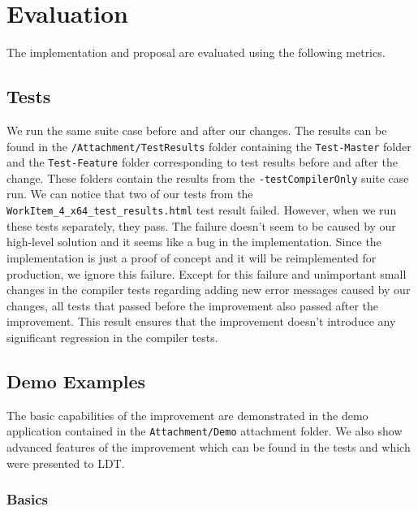 \chapter{Evaluation}

The implementation and proposal are evaluated using the following metrics.

\section{Tests}

We run the same suite case before and after our changes. 
The results can be found in the \texttt{/Attachment/TestResults} folder containing the \texttt{Test-Master} folder and the \texttt{Test-Feature} folder corresponding to test results before and after the change. 
These folders contain the results from the \texttt{-testCompilerOnly} suite case run.
We can notice that two of our tests from the \texttt{WorkItem\_4\_x64\_test\_results.html} test result failed.
However, when we run these tests separately, they pass.
The failure doesn't seem to be caused by our high-level solution and it seems like a bug in the implementation.
Since the implementation is just a proof of concept and it will be reimplemented for production, we ignore this failure.
Except for this failure and unimportant small changes in the compiler tests regarding adding new error messages caused by our changes, all tests that passed before the improvement also passed after the improvement.
This result ensures that the improvement doesn’t introduce any significant regression in the compiler tests.

\section{Demo Examples}

The basic capabilities of the improvement are demonstrated in the demo application contained in the \texttt{Attachment/Demo} attachment folder. 
We also show advanced features of the improvement which can be found in the tests and which were presented to \ac{LDT}. 


\subsection{Basics}

